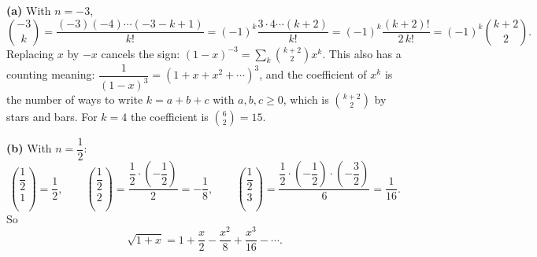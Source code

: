 \textbf{(a)} With $n=-3$,
\[
\binom{-3}{k}=\dfrac{(-3)(-4)\cdots(-3-k+1)}{k!}=(-1)^k\dfrac{3\cdot4\cdots(k+2)}{k!}=(-1)^k\dfrac{(k+2)!}{2\,k!}=(-1)^k\binom{k+2}{2}.
\]
Replacing $x$ by $-x$ cancels the sign: $(1-x)^{-3}=\sum_k\binom{k+2}{2}x^k$. This also has a counting meaning: $\dfrac{1}{(1-x)^3}=(1+x+x^2+\cdots)^3$, and the coefficient of $x^k$ is the number of ways to write $k=a+b+c$ with $a,b,c\ge0$, which is $\binom{k+2}{2}$ by stars and bars. For $k=4$ the coefficient is $\binom62=\boxed{15}$.

\textbf{(b)} With $n=\dfrac{1}{2}$:
\[
\binom{\dfrac{1}{2}}{1}=\dfrac{1}{2},\qquad \binom{\dfrac{1}{2}}{2}=\dfrac{\dfrac{1}{2}\cdot\left(-\dfrac{1}{2}\right)}{2}=-\dfrac{1}{8},\qquad \binom{\dfrac{1}{2}}{3}=\dfrac{\dfrac{1}{2}\cdot\left(-\dfrac{1}{2}\right)\cdot\left(-\dfrac{3}{2}\right)}{6}=\dfrac{1}{16}.
\]
So
\[
\sqrt{1+x}=1+\dfrac{x}{2}-\dfrac{x^2}{8}+\dfrac{x^3}{16}-\cdots .
\]
